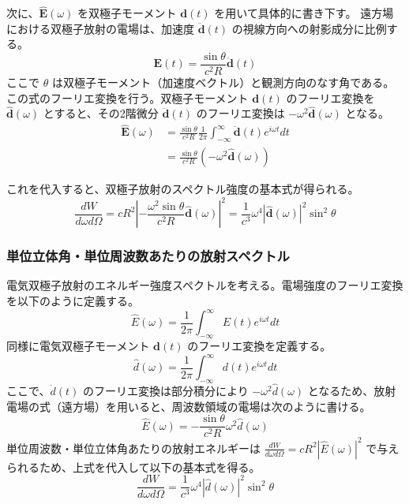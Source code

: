 \documentclass[a4paper,11pt]{bxjsarticle} %
\begin{document}
次に、$\hat{\bm{E}}(\omega)$ を双極子モーメント $\bm{d}(t)$ を用いて具体的に書き下す。
遠方場における双極子放射の電場は、加速度 $\ddot{\bm{d}}(t)$ の視線方向への射影成分に比例する。
\begin{equation}
    \bm{E}(t) = \frac{\sin\theta}{c^2 R} \ddot{\bm{d}}(t)
\end{equation}
ここで $\theta$ は双極子モーメント（加速度ベクトル）と観測方向のなす角である。
この式のフーリエ変換を行う。双極子モーメント $\bm{d}(t)$ のフーリエ変換を $\hat{\bm{d}}(\omega)$ とすると、その2階微分 $\ddot{\bm{d}}(t)$ のフーリエ変換は $-\omega^2 \hat{\bm{d}}(\omega)$ となる。
\begin{align}
    \hat{\bm{E}}(\omega) &= \frac{\sin\theta}{c^2 R} \frac{1}{2\pi} \int_{-\infty}^{\infty} \ddot{\bm{d}}(t) e^{i\omega t} dt \\
    &= \frac{\sin\theta}{c^2 R} \left( -\omega^2 \hat{\bm{d}}(\omega) \right)
\end{align}

これを代入すると、双極子放射のスペクトル強度の基本式が得られる。
\begin{equation}
    \frac{dW}{d\omega d\Omega} = c R^2 \left| - \frac{\omega^2 \sin\theta}{c^2 R} \hat{\bm{d}}(\omega) \right|^2 = \frac{1}{c^3} \omega^4 |\hat{\bm{d}}(\omega)|^2 \sin^2\theta
\end{equation}

\subsubsection{単位立体角・単位周波数あたりの放射スペクトル}

電気双極子放射のエネルギー強度スペクトルを考える。電場強度のフーリエ変換を以下のように定義する。
\begin{equation}
    \hat{E}(\omega) = \frac{1}{2\pi} \int_{-\infty}^{\infty} E(t) e^{i\omega t} dt
\end{equation}
同様に電気双極子モーメント $\bm{d}(t)$ のフーリエ変換を定義する。
\begin{equation}
    \hat{d}(\omega) = \frac{1}{2\pi} \int_{-\infty}^{\infty} d(t) e^{i\omega t} dt
\end{equation}
ここで、$\ddot{d}(t)$ のフーリエ変換は部分積分により $-\omega^2 \hat{d}(\omega)$ となるため、放射電場の式（遠方場）を用いると、周波数領域の電場は次のように書ける。
\begin{equation}
    \hat{E}(\omega) = - \frac{\sin\theta}{c^2 R} \omega^2 \hat{d}(\omega)
\end{equation}
単位周波数・単位立体角あたりの放射エネルギーは $\frac{dW}{d\omega d\Omega} = c R^2 |\hat{E}(\omega)|^2$ で与えられるため、上式を代入して以下の基本式を得る。
\begin{equation}
    \frac{dW}{d\omega d\Omega} = \frac{1}{c^3} \omega^4 |\hat{d}(\omega)|^2 \sin^2\theta
\end{equation}
\end{document}
